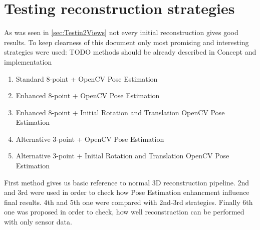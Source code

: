\section{Testing reconstruction strategies}
As was seen in \ref{sec:Testin2Views} not every initial reconstruction gives good results. To keep clearness of this document only most promising and interesting strategies were used: TODO methods should be already described in Concept and implementation
\begin{enumerate}
\item \textnormal{Standard 8-point + OpenCV Pose Estimation} 
\item \textnormal{Enhanced 8-point + OpenCV Pose Estimation} 
\item \textnormal{Enhanced 8-point + Initial Rotation and Translation OpenCV Pose Estimation} 
\item \textnormal{Alternative 3-point + OpenCV Pose Estimation}
\item \textnormal{Alternative 3-point + Initial Rotation and Translation OpenCV Pose Estimation}
\end{enumerate}
First method gives us basic reference to normal 3D reconstruction pipeline. 2nd and 3rd were used in order to check how Pose Estimation enhancment influence final results. 4th and 5th one were compared with 2nd-3rd strategies. Finally 6th one was proposed in order to check, how well reconstraction can be performed with only sensor data.

